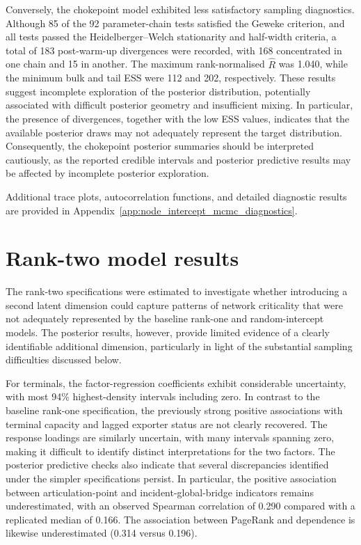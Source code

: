 \documentclass[pdftex,12pt,openright,a4paper,oneside]{book}
\begin{document}
Conversely, the chokepoint model exhibited less satisfactory sampling diagnostics. 
Although 85 of the 92 parameter-chain tests satisfied the Geweke criterion, and all tests passed the 
Heidelberger--Welch stationarity and half-width criteria, a total of 183 post-warm-up divergences were 
recorded, with 168 concentrated in one chain and 15 in another. The maximum rank-normalised $\widehat{R}$ 
was 1.040, while the minimum bulk and tail ESS were 112 and 202, respectively.
These results suggest incomplete exploration of the posterior distribution, potentially associated 
with difficult posterior geometry and insufficient mixing. In particular, the presence of divergences, 
together with the low ESS values, indicates that the available posterior draws 
may not adequately represent the target distribution.
Consequently, the chokepoint posterior summaries should be interpreted cautiously, as the reported 
credible intervals and posterior predictive results may be affected by incomplete posterior exploration.

Additional trace plots, autocorrelation functions, and detailed diagnostic results are provided in Appendix~\ref{app:node_intercept_mcmc_diagnostics}.

\section{Rank-two model results}
\label{sec:rank_two_model}

The rank-two specifications were estimated to investigate whether introducing a second latent dimension could capture patterns of network criticality that were not adequately represented by the baseline rank-one and random-intercept models. The posterior results, however, provide limited evidence of a clearly identifiable additional dimension, particularly in light of the substantial sampling difficulties discussed below.

For terminals, the factor-regression coefficients exhibit considerable uncertainty, with most 94\% highest-density intervals including zero. In contrast to the baseline rank-one specification, the previously strong positive associations with terminal capacity and lagged exporter status are not clearly recovered. The response loadings are similarly uncertain, with many intervals spanning zero, making it difficult to identify distinct interpretations for the two factors. The posterior predictive checks also indicate that several discrepancies identified under the simpler specifications persist. In particular, the positive association between articulation-point and incident-global-bridge indicators remains underestimated, with an observed Spearman correlation of 0.290 compared with a replicated median of 0.166. The association between PageRank and dependence is likewise underestimated (0.314 versus 0.196).
\end{document}
